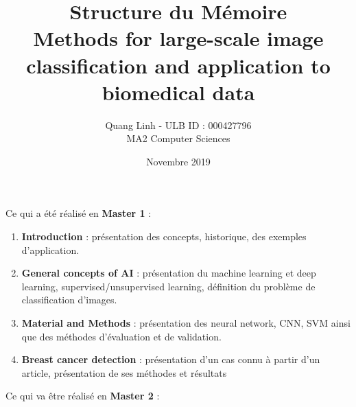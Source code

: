 \documentclass{article}
\title{Structure du Mémoire \\ Methods for large-scale image classification and application to biomedical data}
\author{\bsc{BUI QUANG PHUONG} Quang Linh - ULB ID : 000427796 \\ MA2 Computer Sciences}
\date{Novembre 2019}
\begin{document}
\maketitle

Ce qui a été réalisé en \textbf{Master 1} : 

\begin{enumerate}
\item \textbf{Introduction} : présentation des concepts, historique, des exemples d'application. 

\item \textbf{General concepts of AI} : présentation du machine learning et deep learning, supervised/unsupervised learning, définition du problème de classification d'images. 

\item \textbf{Material and Methods} : présentation des neural network, CNN, SVM ainsi que des méthodes d'évaluation et de validation. 

\item \textbf{Breast cancer detection} : présentation d'un cas connu à partir d'un article, présentation de ses méthodes et résultats 

\end{enumerate}

\noindent\hrulefill

\vspace{0.5cm}
Ce qui va être réalisé en \textbf{Master 2} :
\end{document}
